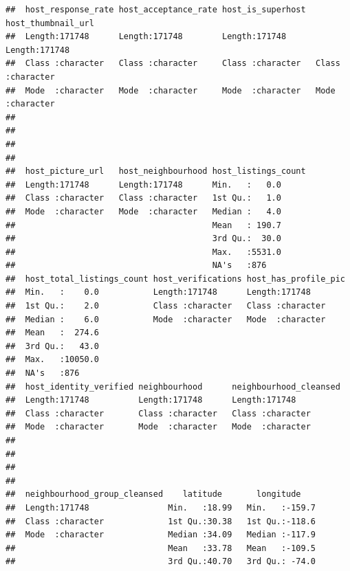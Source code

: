 \documentclass[
]{article}
\begin{document}
\begin{verbatim}
##  host_response_rate host_acceptance_rate host_is_superhost  host_thumbnail_url
##  Length:171748      Length:171748        Length:171748      Length:171748     
##  Class :character   Class :character     Class :character   Class :character  
##  Mode  :character   Mode  :character     Mode  :character   Mode  :character  
##                                                                               
##                                                                               
##                                                                               
##                                                                               
##  host_picture_url   host_neighbourhood host_listings_count
##  Length:171748      Length:171748      Min.   :   0.0     
##  Class :character   Class :character   1st Qu.:   1.0     
##  Mode  :character   Mode  :character   Median :   4.0     
##                                        Mean   : 190.7     
##                                        3rd Qu.:  30.0     
##                                        Max.   :5531.0     
##                                        NA's   :876        
##  host_total_listings_count host_verifications host_has_profile_pic
##  Min.   :    0.0           Length:171748      Length:171748       
##  1st Qu.:    2.0           Class :character   Class :character    
##  Median :    6.0           Mode  :character   Mode  :character    
##  Mean   :  274.6                                                  
##  3rd Qu.:   43.0                                                  
##  Max.   :10050.0                                                  
##  NA's   :876                                                      
##  host_identity_verified neighbourhood      neighbourhood_cleansed
##  Length:171748          Length:171748      Length:171748         
##  Class :character       Class :character   Class :character      
##  Mode  :character       Mode  :character   Mode  :character      
##                                                                  
##                                                                  
##                                                                  
##                                                                  
##  neighbourhood_group_cleansed    latitude       longitude     
##  Length:171748                Min.   :18.99   Min.   :-159.7  
##  Class :character             1st Qu.:30.38   1st Qu.:-118.6  
##  Mode  :character             Median :34.09   Median :-117.9  
##                               Mean   :33.78   Mean   :-109.5  
##                               3rd Qu.:40.70   3rd Qu.: -74.0  

\end{verbatim}
\end{document}
